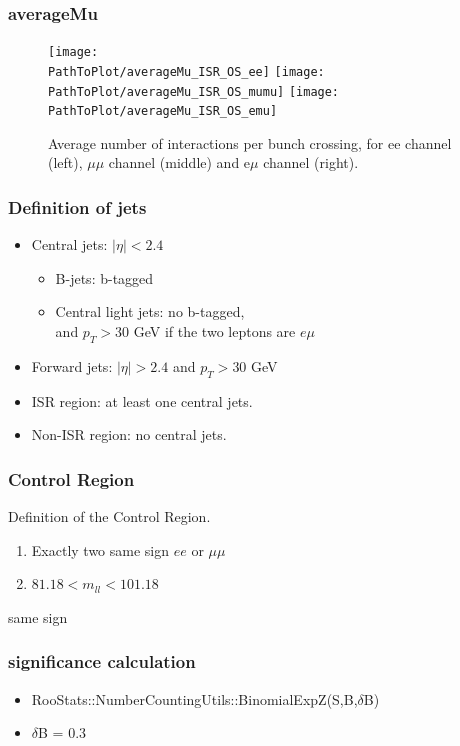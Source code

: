\documentclass[mathserif,serif]{beamer}
\begin{document}
\def \PathToPlot {../plot}
\begin{frame}
\frametitle{averageMu}
\begin{figure}
\texttt{[image: \\PathToPlot/averageMu\_ISR\_OS\_ee]}
\texttt{[image: \\PathToPlot/averageMu\_ISR\_OS\_mumu]}
\texttt{[image: \\PathToPlot/averageMu\_ISR\_OS\_emu]} \\
\caption{Average number of interactions per bunch crossing, for ee channel (left), $\mu\mu$ channel (middle) and e$\mu$ channel (right).}
\end{figure}
\end{frame}

\begin{frame}
\frametitle{Definition of jets}
\normalsize
\begin{itemize}
\item Central jets: $|\eta|<2.4$
\begin{itemize}
\item B-jets: b-tagged
\item Central light jets: no b-tagged,\\
and $p_T>30$ GeV if the two leptons are $e\mu$
\end{itemize}
\item Forward jets: $|\eta|>2.4$ and $p_T>30$ GeV
\item ISR region: at least one central jets.
\item Non-ISR region: no central jets.
\end{itemize}
\end{frame}

\begin{frame}
\frametitle{Control Region}
Definition of the Control Region.
\begin{enumerate}
\item Exactly two same sign $ee$ or $\mu\mu$
\item $81.18 < m_{ll} < 101.18$
\end{enumerate}
\end{frame}

\begin{frame}
\begin{center}
\huge
same sign
\end{center}
\end{frame}


%

\begin{frame}
\frametitle{significance calculation}
\begin{itemize}
\item RooStats::NumberCountingUtils::BinomialExpZ(S,B,$\delta$B)
\item $\delta$B = 0.3
\end{itemize}
\end{frame}
\end{document}
